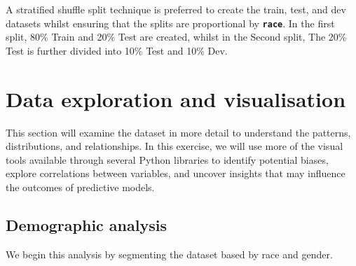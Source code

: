 A stratified shuffle split technique is preferred to create the train, test, and dev datasets whilst ensuring that the splits are proportional by \textbf{\texttt{race}}. In the first split, 80\% Train and 20\% Test are created, whilst in the Second split, The 20\% Test is further divided into 10\% Test and 10\% Dev.


\section{Data exploration and visualisation}

This section will examine the dataset in more detail to understand the patterns, distributions, and relationships. In this exercise, we will use more of the visual tools available through several Python libraries to identify potential biases, explore correlations between variables, and uncover insights that may influence the outcomes of predictive models. 

\subsection {Demographic analysis}

We begin this analysis by segmenting the dataset based by race and gender.


